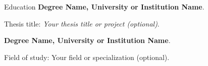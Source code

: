 \begin{rubric}{Education}
%
	\textbf{Degree Name, University or Institution Name}.\par
	Thesis title: \emph{Your thesis title or project (optional)}.

%
	\textbf{Degree Name, University or Institution Name}.\par
	Field of study: Your field or specialization (optional).
\end{rubric}
